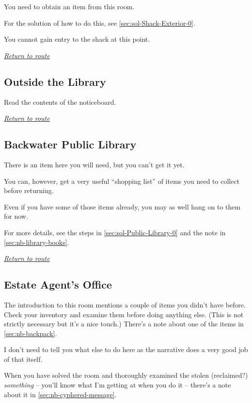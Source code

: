 \documentclass[a5paper]{extarticle}
\begin{document}
You need to obtain an item from this room.

For the solution of how to do this, see \cref{sec:sol-Shack-Exterior-0}.

You cannot gain entry to the shack at this point.

\hyperref[sec:route-1]{\emph{Return to route}}

\newpage
\subsection{Outside the Library}\label{sec:req-Outside-the-Library}

Read the contents of the noticeboard.

\hyperref[sec:route-1]{\emph{Return to route}}

\newpage
\subsection{Backwater Public Library}\label{sec:req-Public-Library-0}

There is an item here you will need, but you can't get it yet.

You can, however, get a very useful \enquote{shopping list} of items you need
to collect before returning.

Even if you have some of those items already, you may as well hang on to them
for now.

For more details, see the steps in \cref{sec:sol-Public-Library-0}
and the note in \cref{sec:nb-library-books}.

\hyperref[sec:route-1]{\emph{Return to route}}

\newpage
\subsection{Estate Agent's Office}\label{sec:req-Estate-Agent's-Office}

The introduction to this room mentions a couple of items you didn't have before.
Check your inventory and examine them before doing anything else.
(This is not strictly necessary but it's a nice touch.)
There's a note about one of the items in \cref{sec:nb-backpack}.

I don't need to tell you what else to do here as the narrative does a very good job of that itself.

When you have solved the room and thoroughly examined the stolen (reclaimed?)
\emph{something} -- you'll know what I'm getting at when you do it --
there's a note about it in \cref{sec:nb-cyphered-message}.
\end{document}
